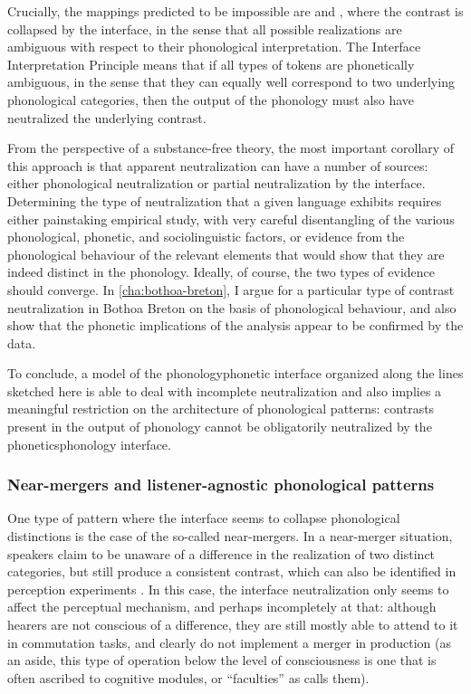 Crucially, the mappings predicted to be impossible are  and , where the contrast is collapsed by the interface, in the sense that all possible realizations are ambiguous with respect to their phonological interpretation. The Interface Interpretation Principle means that if all types of tokens are phonetically ambiguous, in the sense that they can equally well correspond to two underlying phonological categories, then the output of the phonology must also have neutralized the underlying contrast.

From the perspective of a substance\hyp free theory, the most important corollary of this approach is that apparent neutralization can have a number of sources: either phonological neutralization or partial neutralization by the interface. Determining the type of neutralization that a given language exhibits requires either painstaking empirical study, with very careful disentangling of the various phonological, phonetic, and sociolinguistic factors, or evidence from the phonological behaviour of the relevant elements that would show that they are indeed distinct in the phonology. Ideally, of course, the two types of evidence should converge. In \cref{cha:bothoa-breton}, I argue for a particular type of contrast neutralization in Bothoa Breton on the basis of phonological behaviour, and also show that the phonetic implications of the analysis appear to be confirmed by the data.

To conclude, a model of the phonology\endash phonetic interface organized along the lines sketched here is able to deal with incomplete neutralization and also implies a meaningful restriction on the architecture of phonological patterns: contrasts present in the output of phonology cannot be obligatorily neutralized by the phonetics\endash phonology interface.

\subsubsection{Near-mergers and listener-agnostic phonological patterns}
\label{sec:near-merg-list}

One type of pattern where the interface seems to collapse phonological distinctions is the case of the so\hyp called near\hyp mergers. In a near\hyp merger situation, speakers claim to be unaware of a difference in the realization of two distinct categories, but still produce a consistent contrast, which can also be identified in perception experiments \citep{labov72:_quant,labov94:_princ,milroy80:_wheny,di90:_phonat_utah,gordon02:_inves}. In this case, the interface neutralization only seems to affect the perceptual mechanism, and perhaps incompletely at that: although hearers are not conscious of a difference, they are still mostly able to attend to it in commutation tasks, and clearly do not implement a merger in production (as an aside, this type of operation below the level of consciousness is one that is often ascribed to cognitive modules, or \enquote{faculties} as \citealt{fodor83:_modul} calls them).

